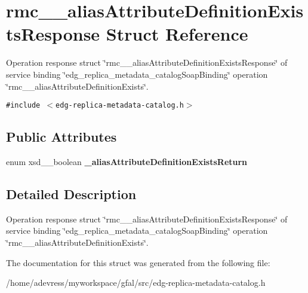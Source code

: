 \section{rmc\_\-\_\-alias\-Attribute\-Definition\-Exists\-Response Struct Reference}
\label{structrmc____aliasAttributeDefinitionExistsResponse}
Operation response struct \char`\"{}rmc\_\-\_\-alias\-Attribute\-Definition\-Exists\-Response\char`\"{} of service binding \char`\"{}edg\_\-replica\_\-metadata\_\-catalog\-Soap\-Binding\char`\"{} operation \char`\"{}rmc\_\-\_\-alias\-Attribute\-Definition\-Exists\char`\"{}.  


{\tt \#include $<$edg-replica-metadata-catalog.h$>$}

\subsection*{Public Attributes}
\begin{CompactItemize}
\item 
enum xsd\_\-\_\-boolean \textbf{\_\-alias\-Attribute\-Definition\-Exists\-Return}\label{structrmc____aliasAttributeDefinitionExistsResponse_449aa2e46735a87af8cceeb366468b02}

\end{CompactItemize}


\subsection{Detailed Description}
Operation response struct \char`\"{}rmc\_\-\_\-alias\-Attribute\-Definition\-Exists\-Response\char`\"{} of service binding \char`\"{}edg\_\-replica\_\-metadata\_\-catalog\-Soap\-Binding\char`\"{} operation \char`\"{}rmc\_\-\_\-alias\-Attribute\-Definition\-Exists\char`\"{}. 



The documentation for this struct was generated from the following file:\begin{CompactItemize}
\item 
/home/adevress/myworkspace/gfal/src/edg-replica-metadata-catalog.h\end{CompactItemize}
